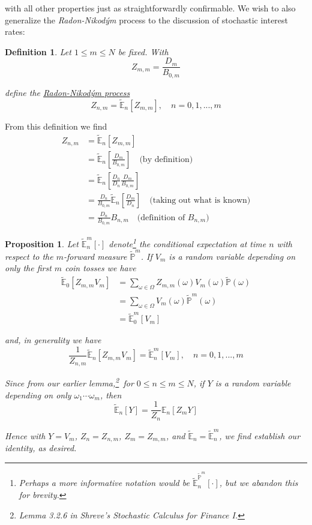 \documentclass[12pt]{article}
\newtheorem{definition}{Definition}
\newtheorem{proposition}{Proposition}
\newlength\tindent
\renewcommand{\indent}{\hspace*{\tindent}}
\renewcommand{\P}{\mathbb P}
\newcommand{\E}{\mathbb E}
\begin{document}
with all other properties just as straightforwardly confirmable. We wish to also generalize the {\em Radon-Nikod{\'y}m} process to the discussion of stochastic interest rates:
\begin{definition} Let $1 \leq m \leq N$ be fixed. With
\begin{equation*}
	Z_{m,m} = \frac{ D_m }{ B_{0,m} }
\end{equation*}

define the \underline{Radon-Nikod{\'y}m process}
\begin{equation*}
	Z_{n,m} = \tilde{\E}_n[Z_{m,m}],\quad n=0,1,...,m
\end{equation*}
\end{definition}

From this definition we find
\begin{align*}
	Z_{n,m} &= \tilde{\E}_n[Z_{m,m}] \\
	&= \tilde{\E}_n \left[ \frac{D_m}{B_{0,m}} \right] \quad \text{(by definition)} \\
	&= \tilde{\E}_n \left[ \frac{D_n}{D_n} \frac{D_m}{B_{0,m}} \right] \\
	&= \frac{D_n}{B_{0,m}} \tilde{\E}_n \left[ \frac{D_m}{D_n} \right] \quad \text{(taking out what is known)} \\
	&= \frac{D_n}{B_{0,m}} B_{n,m} \quad \text{(definition of $B_{n,m}$)}
\end{align*}

\begin{proposition} Let $\tilde{\E}^m_n \left[ \cdot \right]$ denote\footnote{Perhaps a more informative notation would be $\tilde{\E}^{\tilde{\P}^m}_n[\cdot]$, but we abandon this for brevity.} the conditional expectation at time $n$ with respect to the $m$-forward measure $\tilde{\P}^m$. If $V_m$ is a random variable depending on only the first $m$ coin tosses we have
\begin{align*}
	\tilde{\E}_0[Z_{m,m}V_m] &= \sum_{\omega\in\Omega} Z_{m,m}(\omega)V_m(\omega)\tilde{\P}(\omega) \\
	&= \sum_{\omega\in\Omega} V_m(\omega)\tilde{\P}^m(\omega) \\
	&= \tilde{\E}^m_0 [V_m]
\end{align*}

and, in generality we have
\begin{equation*}
	\frac{1}{Z_{n,m}} \tilde{\E}_n[Z_{m,m}V_m] = \tilde{\E}^m_n[V_m], \quad n = 0,1,...,m
\end{equation*}

\indent Since from our earlier lemma,\footnote{Lemma 3.2.6 in Shreve's Stochastic Calculus for Finance I.}~for $0 \leq n \leq m \leq N$, if $Y$ is a random variable depending on only $\omega_1\cdots\omega_m$, then
\begin{equation*}
	\tilde{\E}_n[Y] = \frac{1}{Z_n}\E_n[Z_mY]
\end{equation*}

\indent Hence with $Y = V_m$, $Z_n = Z_{n,m}$, $Z_m = Z_{m,m}$, and $\tilde{\E}_n = \tilde{\E}^m_n$, we find establish our identity, as desired.
\end{proposition} \hfill
\end{document}
